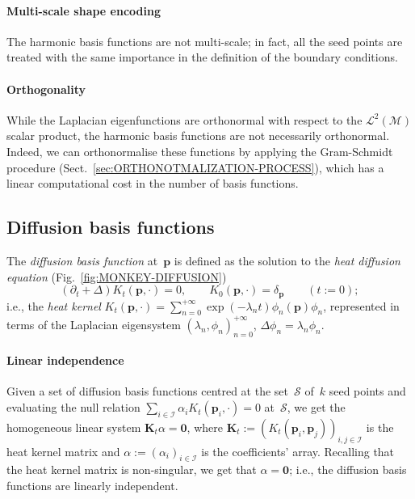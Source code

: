 \documentclass[acmtog,authorversion]{acmart}
\begin{document}
\paragraph*{Multi-scale shape encoding}
The harmonic basis functions are not multi-scale; in fact, all the seed points are treated with the same importance in the definition of the boundary conditions.

\paragraph*{Orthogonality}
While the Laplacian eigenfunctions are orthonormal with respect to the \mbox{$\mathcal{L}^{2}(\mathcal{M})$} scalar product, the harmonic basis functions are not necessarily orthonormal. Indeed, we can orthonormalise these functions by applying the Gram-Schmidt procedure (Sect.~\ref{sec:ORTHONOTMALIZATION-PROCESS}), which has a linear computational cost in the number of basis functions. 

\subsection{Diffusion basis functions\label{sec:DIFFUSION-BASIS}}
The \emph{diffusion basis function} at~$\mathbf{p}$ is defined as the solution to the \emph{heat diffusion equation} (Fig.~\ref{fig:MONKEY-DIFFUSION})
%
\begin{equation*}
(\partial_{t}+\Delta) K_{t}(\mathbf{p},\cdot)=0,\qquad
K_{0}(\mathbf{p},\cdot)=\delta_{\mathbf{p}}\qquad (t:=0);
\end{equation*}
%
i.e., the \emph{heat kernel} \mbox{$K_{t}(\mathbf{p},\cdot)
=\sum_{n=0}^{+\infty}\exp(-\lambda_{n}t)\phi_{n}(\mathbf{p})\phi_{n}$}, represented in terms of the Laplacian eigensystem \mbox{$(\lambda_{n},\phi_{n})_{n=0}^{+\infty}$}, \mbox{$\Delta\phi_{n}=\lambda_{n}\phi_{n}$}.

\paragraph*{Linear independence}
Given a set of diffusion basis functions centred at the set~$\mathcal{S}$ of~$k$ seed points and evaluating the null relation \mbox{$\sum_{i\in\mathcal{I}}\alpha_{i}K_{t}(\mathbf{p}_{i},\cdot)=0$} at~$\mathcal{S}$, we get the homogeneous linear system \mbox{$\mathbf{K}_{t}\alpha=\mathbf{0}$}, where \mbox{$\mathbf{K}_{t}:=(K_{t}(\mathbf{p}_{i},\mathbf{p}_{j}))_{i,j\in\mathcal{I}}$} is the heat kernel matrix and \mbox{$\alpha:=(\alpha_{i})_{i\in\mathcal{I}}$} is the coefficients' array. Recalling that the heat kernel matrix is non-singular, we get that \mbox{$\alpha=\mathbf{0}$}; i.e., the diffusion basis functions are linearly independent.
\end{document}
